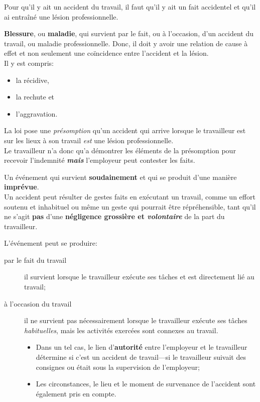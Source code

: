 \documentclass[10pt, french]{article}
\begin{document}
\begin{multicols*}{3}
Pour qu'il y ait un accident du travail, il faut qu'il y ait un fait accidentel et qu'il ai entraîné une lésion professionnelle.

\begin{definitionNOHFILL}
\textbf{Blessure}, ou \textbf{maladie}, qui survient par le fait, ou à l’occasion, d’un accident du travail, ou maladie professionnelle. Donc, il doit y avoir une relation de cause à effet et non seulement une coïncidence entre l'accident et la lésion.\\

Il y  est compris: 
\begin{itemize}[leftmargin = *]
	\item	la récidive, 
	\item	la rechute et 
	\item	l’aggravation.
\end{itemize}

La loi pose une \textit{présomption} qu'un accident qui arrive lorsque le travailleur est sur les lieux à son travail \textit{est} une lésion professionnelle.\\
Le travailleur n'a donc qu'a démontrer les éléments de la présomption pour recevoir l'indemnité \textit{\textbf{mais}} l'employeur peut contester les faits.
\end{definitionNOHFILL}

\begin{definitionNOHFILL}
Un événement qui survient \textbf{soudainement} et qui se produit d'une manière \textbf{imprévue}. \\

Un accident peut résulter de gestes faits en exécutant un travail, comme un effort soutenu et inhabituel ou même un geste qui pourrait être répréhensible, tant qu'il ne s'agit \textbf{pas} d'une \textbf{négligence grossière et \textit{volontaire}} de la part du travailleur.
\end{definitionNOHFILL}

L'événement peut se produire:
\begin{description}
	\item[par le fait du travail]	il survient lorsque le travailleur exécute ses tâches et est directement lié au travail;
	\item[à l'occasion du travail]	il ne survient pas nécessairement lorsque le travailleur exécute ses tâches \textit{habituelles}, mais les activités exercées sont connexes au travail.
		\begin{itemize}[leftmargin = *]
		\item	Dans un tel cas, le lien d'\textbf{autorité} entre l'employeur et le travailleur détermine si c'est un accident de travail---si le travailleur suivait des consignes ou était sous la supervision de l'employeur;
		\item	Les circonstances, le lieu et le moment de survenance de l'accident sont également pris en compte.
		\end{itemize}
\end{description}


\end{multicols*}
\end{document}
